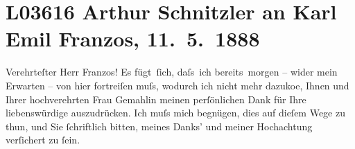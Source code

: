 

\section[Arthur Schnitzler an Karl Emil Franzos, 11. 5. 1888]{L03616 Arthur Schnitzler an Karl Emil Franzos, 11. 5. 1888}
\nopagebreak{}
\rehead{ }\normalsize\beginnumbering{}
\toendnotes[C]{\smallbreak\pagebreak[2]}
\toendnotes[C]{\smallbreak}
\pstart\center{}{\pb}Verehrteſter Herr Franzos!\pend\vspace{0.5em}
\pstart
           Es fügt ſich, daſs ich bereits morgen – wider mein Erwarten – von hier fortreiſen
               muſs, wodurch ich nicht mehr dazuko{\geminationm}e, Ihnen und Ihrer
               hochverehrten Frau Gemahlin
               meinen perſönlichen Dank für Ihre liebenswürdige \label{K_L03616-33v}\label{K_L03616-33} auszudrücken. Ich muſs mich begnügen, dies auf dieſem
               Wege zu thun, und Sie ſchriftlich bitten, meines Danks’ und meiner Hochachtung
               verſichert zu ſein.\pend
           
